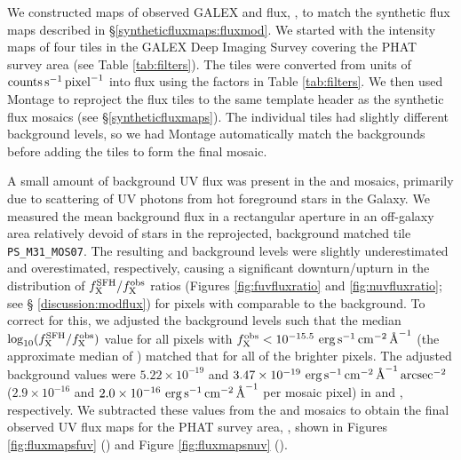 \documentclass[iop, tighten]{emulateapj}
\begin{document}
We constructed maps of observed GALEX \fuv{} and \nuv{} flux, \fxobs{}, to
match the synthetic flux maps described in \S \ref{syntheticfluxmaps:fluxmod}.
We started with the intensity maps of four tiles in the GALEX Deep Imaging
Survey \citep[DIS][]{Martin:2005} covering the PHAT survey area (see Table
\ref{tab:filters}). The tiles were converted from units of $\mathrm{counts}
\,\mathrm{s}^{-1} \,\mathrm{pixel}^{-1}$ into flux using the factors in Table
\ref{tab:filters}. We then used Montage to reproject the flux tiles to the same
template header as the synthetic flux mosaics (see \S \ref{syntheticfluxmaps}).
The individual tiles had slightly different background levels, so we had
Montage automatically match the backgrounds before adding the tiles to form the
final mosaic.

A small amount of background UV flux was present in the \fuv{} and \nuv{}
mosaics, primarily due to scattering of UV photons from hot foreground stars in
the Galaxy. We measured the mean background flux in a rectangular aperture in
an off-galaxy area relatively devoid of stars in the reprojected, background
matched tile \texttt{PS\_M31\_MOS07}. The resulting \fuv{} and \nuv{}
background levels were slightly underestimated and overestimated, respectively,
causing a significant downturn/upturn in the distribution of $f_{\mathrm{X}}^{\mathrm{SFH}}/f_{\mathrm{X}}^{\mathrm{obs}}$
ratios (Figures \ref{fig:fuvfluxratio} and \ref{fig:nuvfluxratio}; see \S
\ref{discussion:modflux}) for pixels with \fxobs{} comparable to the
background. To correct for this, we adjusted the background levels such that
the median $\log_{10}(f_{\mathrm{X}}^{\mathrm{SFH}}/f_{\mathrm{X}}^{\mathrm{obs}})$ value for all pixels with $f_{\mathrm{X}}^{\mathrm{obs}} <
10^{-15.5}\, \,\mathrm{erg}\,\mathrm{s}^{-1}\,\mathrm{cm}^{-2}\,\textrm{\AA}^{-1}$ (the approximate median of \fxobs{}) matched that for all
of the brighter pixels. The adjusted background values were $5.22 \times
10^{-19}$ and $3.47 \times 10^{-19}\, \,\mathrm{erg}\,\mathrm{s}^{-1}\,\mathrm{cm}^{-2}\,\textrm{\AA}^{-1}\,\mathrm{arcsec}^{-2}$ ($2.9 \times
10^{-16}$ and $2.0 \times 10^{-16}\, \,\mathrm{erg}\,\mathrm{s}^{-1}\,\mathrm{cm}^{-2}\,\textrm{\AA}^{-1}$ per mosaic pixel) in \fuv{} and
\nuv{}, respectively. We subtracted these values from the \fuv{} and \nuv{}
mosaics to obtain the final observed UV flux maps for the PHAT survey area,
\fxobs{}, shown in Figures \ref{fig:fluxmapsfuv} (\fuv{}) and Figure
\ref{fig:fluxmapsnuv} (\nuv{}).

%
%
\end{document}
